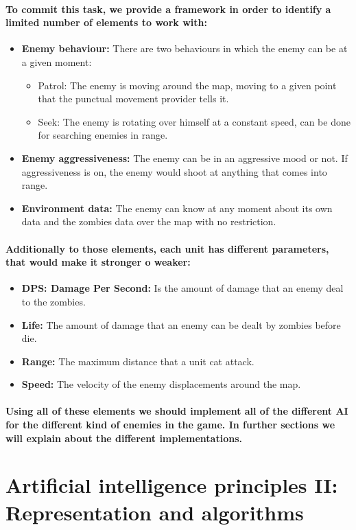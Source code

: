 \documentclass[a4paper,10pt]{article}
\newcommand{\p}[1]{\paragraph{\indent\textnormal{#1}}}
\begin{document}
    \p{To commit this task, we provide a framework in order to identify a limited number of elements to work with:}

    \begin{itemize}
     \item \textbf{Enemy behaviour:} There are two behaviours in which the enemy can be at a given moment:
	 \begin{itemize}
	    \item Patrol: The enemy is moving around the map, moving to a given point that the punctual movement provider tells it.
	    \item Seek: The enemy is rotating over himself at a constant speed, can be done for searching enemies in range.
	  \end{itemize}

     \item \textbf{Enemy aggressiveness:} The enemy can be in an aggressive mood or not. If aggressiveness is on, the enemy would shoot at anything that comes into range.
     \item \textbf{Environment data:} The enemy can know at any moment about its own data and the zombies data over the map with no restriction.
    \end{itemize}

    \p{Additionally to those elements, each unit has different parameters, that would make it stronger o weaker:}

      \begin{itemize}
       \item \textbf{DPS: Damage Per Second:} Is the amount of damage that an enemy deal to the zombies.
       \item \textbf{Life:} The amount of damage that an enemy can be dealt by zombies before die.
       \item \textbf{Range:} The maximum distance that a unit cat attack.
       \item \textbf{Speed:} The velocity of the enemy displacements around the map.
      \end{itemize}

    \p{Using all of these elements we should implement all of the different AI for the different kind of enemies in the game. In further sections we will explain about the different implementations.}



  \newpage
\section{Artificial intelligence principles II: Representation and algorithms}
\end{document}

